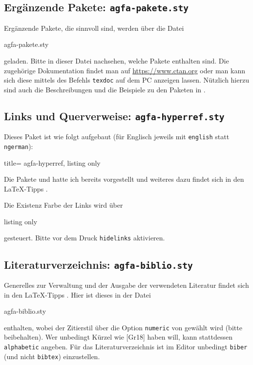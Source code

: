 \subsection{Ergänzende Pakete: \texttt{agfa-pakete.sty}}\label{subsec:agfa-pakete}
%
Ergänzende Pakete, die sinnvoll sind, werden über die Datei
%
\begin{tcolorbox}
agfa-pakete.sty
\end{tcolorbox}
%
geladen.
Bitte in dieser Datei nachsehen, welche Pakete enthalten sind.
Die zugehörige Dokumentation findet man auf \href{https://www.ctan.org}{https://www.ctan.org} oder man kann sich diese mittels des Befehls \texttt{texdoc}  auf dem PC anzeigen lassen.
Nützlich hierzu sind auch die Beschreibungen und die Beispiele zu den Paketen in \textcite{voss:2025a}.
%
\subsection{Links und Querverweise: \texttt{agfa-hyperref.sty}}\label{subsec:agfa-hyperref}
Dieses Paket ist wie folgt aufgebaut (für Englisch jeweils mit \texttt{english} statt \texttt{ngerman}):
%
\begin{tcblisting}{title= agfa-hyperref, listing only}
\RequirePackage[breaklinks=true]{hyperref}   
\end{tcblisting}
%
Die Pakete  und  hatte ich bereits vorgestellt und weiteres dazu findet sich in den \LaTeX{}-Tipps \cite{latextipps2}.

Die Existenz \bzw Farbe der Links wird über
%
\begin{tcblisting}{listing only}
\hypersetup{
	,colorlinks	= true    	%
	,urlcolor	= blue      	%
	,citecolor	= blue      	%
	,linkcolor	= blue		%
	}
\end{tcblisting}
%
gesteuert.
Bitte vor dem Druck \texttt{hidelinks} aktivieren.
%
\subsection{Literaturverzeichnis: \texttt{agfa-biblio.sty}}\label{subsec:agfa-biblio}
%
Generelles zur Verwaltung und der Ausgabe der verwendeten Literatur findet sich in den \LaTeX-Tipps \cite{latextipps4}.
Hier ist dieses in der Datei
%
\begin{tcolorbox}
agfa-biblio.sty
\end{tcolorbox}
%
enthalten, wobei der Zitierstil über die Option \texttt{numeric} von  gewählt wird (bitte beibehalten).
Wer unbedingt Kürzel wie [Gr18] haben will, kann stattdessen \texttt{alphabetic} angeben.
Für das Literaturverzeichnis ist im Editor unbedingt \texttt{biber} (und nicht \texttt{bibtex}) einzustellen.

